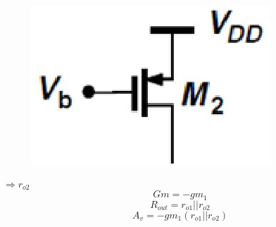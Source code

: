 \documentclass{beamer}
\begin{document}
\begin{frame}
\begin{minipage}{0.45\linewidth}
    \end{minipage}
    \begin{minipage}{0.535\linewidth}
        \begin{minipage}{0.5\linewidth}
            \begin{figure}[H]
                \includegraphics[width=0.8\linewidth]{Rin23}
            \end{figure}
        \end{minipage}
        $\Rightarrow r_{o2}$\\
        \begin{equation*}
            Gm = -gm_1
        \end{equation*}
        \begin{equation*}
            R_{out} = r_{o1}||r_{o2}
        \end{equation*}
        \begin{equation*}
            A_v = -gm_1\left( r_{o1}||r_{o2} \right)
        \end{equation*}
    \end{minipage}
\end{frame}
\end{document}
